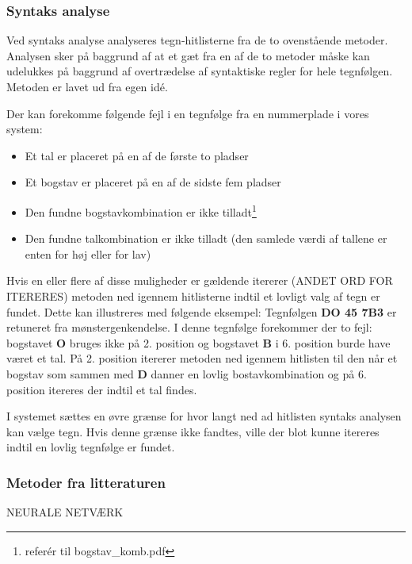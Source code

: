 \subsubsection{Syntaks analyse}

Ved syntaks analyse analyseres tegn-hitlisterne fra de to ovenstående metoder. Analysen sker på baggrund af at et gæt fra en af de to metoder måske kan udelukkes på baggrund af overtrædelse af syntaktiske regler for hele tegnfølgen. Metoden er lavet ud fra egen idé.

Der kan forekomme følgende fejl i en tegnfølge fra en nummerplade i vores system:

\begin{itemize}
\item Et tal er placeret på en af de første to pladser
\item Et bogstav er placeret på en af de sidste fem pladser
\item Den fundne bogstavkombination er ikke tilladt\footnote{referér til bogstav\_komb.pdf}
\item Den fundne talkombination er ikke tilladt (den samlede værdi af tallene er enten for høj eller for lav)
\end{itemize}

Hvis en eller flere af disse muligheder er gældende itererer (ANDET ORD FOR ITERERES) metoden ned igennem hitlisterne indtil et lovligt valg af tegn er fundet. Dette kan illustreres med følgende eksempel: Tegnfølgen \textbf{DO 45 7B3} er retuneret fra mønstergenkendelse. I denne tegnfølge forekommer der to fejl: bogstavet \textbf{O} bruges ikke på 2. position og bogstavet \textbf{B} i 6. position burde have været et tal. På 2. position itererer metoden ned igennem hitlisten til den når et bogstav som sammen med \textbf{D} danner en lovlig bostavkombination og på 6. position itereres der indtil et tal findes.

I systemet sættes en øvre grænse for hvor langt ned ad hitlisten syntaks analysen kan vælge tegn. Hvis denne grænse ikke fandtes, ville der blot kunne itereres indtil en lovlig tegnfølge er fundet.

\subsubsection{Metoder fra litteraturen}

NEURALE NETVÆRK
